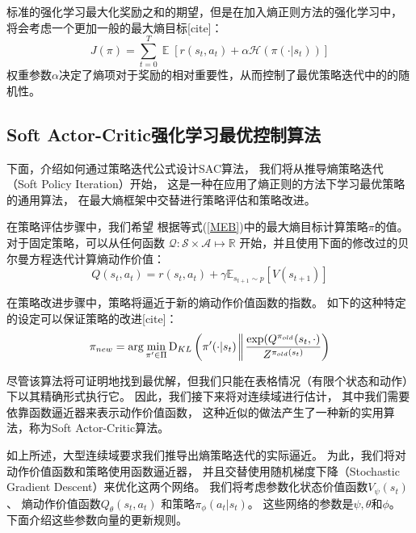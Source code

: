 \documentclass[AutoFakeBold]{LZUThesis}
\begin{document}
标准的强化学习最大化奖励之和的期望，但是在加入熵正则方法的强化学习中，
将会考虑一个更加一般的最大熵目标[cite]：
\begin{equation}
  J(\pi) = \sum_{t = 0}^T \mathop{\mathbb{E}} \left[ r(s_t, a_t) 
  + \alpha \mathcal{H}(\pi(\cdot | s_t)) \right]
  \label{MEB}
\end{equation}
权重参数$\alpha$决定了熵项对于奖励的相对重要性，从而控制了最优策略迭代中的的随机性。

\subsection{Soft Actor-Critic强化学习最优控制算法}
下面，介绍如何通过策略迭代公式设计SAC算法，
我们将从推导熵策略迭代（Soft Policy Iteration）开始，
这是一种在应用了熵正则的方法下学习最优策略的通用算法，
在最大熵框架中交替进行策略评估和策略改进。

在策略评估步骤中，我们希望
根据等式(\ref{MEB})中的最大熵目标计算策略$\pi$的值。
对于固定策略，可以从任何函数
$\mathcal{Q} : \mathcal{S} \times \mathcal{A} \mapsto \mathbb{R}$
开始，并且使用下面的修改过的贝尔曼方程迭代计算熵动作价值：
\begin{equation}
  Q(s_t, a_t) = r(s_t, a_t) + \gamma 
  \mathbb{E}_{s_{t + 1} \sim p} \left[ V(s_{t + 1}) \right]
\end{equation}

在策略改进步骤中，策略将逼近于新的熵动作价值函数的指数。
如下的这种特定的设定可以保证策略的改进[cite]：
\begin{equation}
  \pi_{new} = \arg \min_{\pi^\prime \in \Pi} \mathrm{D}_{KL} 
  \left( \pi^\prime(\cdot | s_t) \bigg\Arrowvert
  \frac{\exp(Q^{\pi_{old}}(s_t, \cdot)}{Z^{\pi_{old}(s_t)}} \right)
  \label{pi_upd}
\end{equation}

尽管该算法将可证明地找到最优解，但我们只能在表格情况（有限个状态和动作）下以其精确形式执行它。
因此，我们接下来将对连续域进行估计，
其中我们需要依靠函数逼近器来表示动作价值函数，
这种近似的做法产生了一种新的实用算法，称为Soft Actor-Critic算法。

如上所述，大型连续域要求我们推导出熵策略迭代的实际逼近。
为此，我们将对动作价值函数和策略使用函数逼近器，
并且交替使用随机梯度下降（Stochastic Gradient Descent）来优化这两个网络。
我们将考虑参数化状态价值函数$V_\psi(s_t)$、
熵动作价值函数$Q_\theta(s_t,a_t)$
和策略$\pi_{\phi}(a_t|s_t)$。
这些网络的参数是$ \psi, \theta$和$\phi$。
下面介绍这些参数向量的更新规则。
\end{document}
